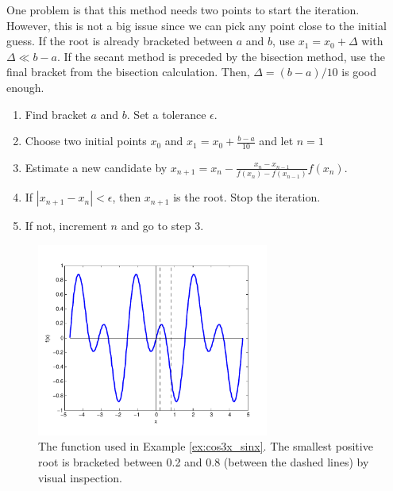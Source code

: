 One problem is that this method needs two points to start the iteration. However, this is not a big issue since we can pick any point close to the initial guess. If the root is already bracketed between $a$ and $b$, use $x_1 = x_0 + \Delta$ with $\Delta \ll b-a$. If the secant method is preceded by the bisection method, use the final bracket from the bisection calculation.  Then, $\Delta = (b-a)/10$ is good enough.

\bigskip
\begin{myalgobox}
		\label{argo:secant}

				\begin{minipage}{5.5in}
					\begin{enumerate}
						\item Find bracket $a$ and $b$. Set a tolerance $\epsilon$. 
						\item Choose two initial points
						$x_0$ and $x_1 = x_0 + \displaystyle\frac{b-a}{10}$ and let $n=1$
						\item Estimate a new candidate by $x_{n+1} = x_n - \displaystyle\frac{x_n-x_{n-1}}{f(x_n)-f(x_{n-1})} f(x_n)$.
						\item If $|x_{n+1}-x_n| < \epsilon$, then $x_{n+1}$ is the root.  Stop the iteration.
						\item If not, increment $n$ and go to step 3.
					\end{enumerate}
				\end{minipage}
\end{myalgobox}

\begin{figure}
\centerline{\includegraphics[width=3in]{04.root-finding/cos3x_sinx.pdf}}
\caption{The function used in Example \ref{ex:cos3x_sinx}.  The smallest positive root is bracketed between 0.2 and 0.8 (between the dashed lines) by visual inspection.}
\label{fig:cos3x_sinx}
\end{figure}

